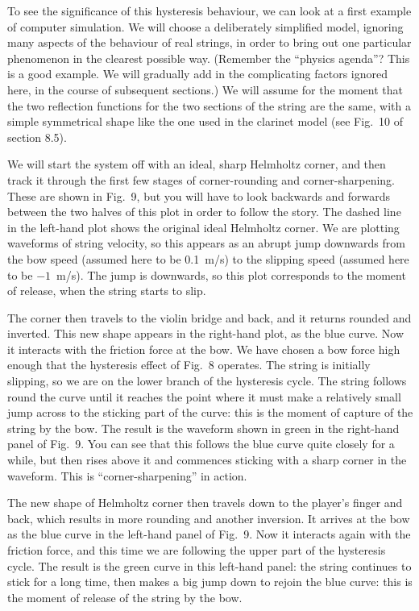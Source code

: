   To see the significance of this hysteresis behaviour, we can look at a first 
  example of computer simulation. We will choose a deliberately simplified 
  model, ignoring many aspects of the behaviour of real strings, in order to 
  bring out one particular phenomenon in the clearest possible way. (Remember 
  the “physics agenda”? This is a good example. We will gradually add in the 
  complicating factors ignored here, in the course of subsequent sections.) We 
  will assume for the moment that the two reflection functions for the two 
  sections of the string are the same, with a simple symmetrical shape like the 
  one used in the clarinet model (see Fig.\ 10 of section 8.5). 

  We will start the system off with an ideal, sharp Helmholtz corner, and then 
  track it through the first few stages of corner-rounding and 
  corner-sharpening. These are shown in Fig.\ 9, but you will have to look 
  backwards and forwards between the two halves of this plot in order to follow 
  the story. The dashed line in the left-hand plot shows the original ideal 
  Helmholtz corner. We are plotting waveforms of string velocity, so this 
  appears as an abrupt jump downwards from the bow speed (assumed here to be 
  0.1~m/s) to the slipping speed (assumed here to be $-1$~m/s). The jump is 
  downwards, so this plot corresponds to the moment of release, when the string 
  starts to slip. 

  The corner then travels to the violin bridge and back, and it returns rounded 
  and inverted. This new shape appears in the right-hand plot, as the blue 
  curve. Now it interacts with the friction force at the bow. We have chosen a 
  bow force high enough that the hysteresis effect of Fig.\ 8 operates. The 
  string is initially slipping, so we are on the lower branch of the hysteresis 
  cycle. The string follows round the curve until it reaches the point where it 
  must make a relatively small jump across to the sticking part of the curve: 
  this is the moment of capture of the string by the bow. The result is the 
  waveform shown in green in the right-hand panel of Fig.\ 9. You can see that 
  this follows the blue curve quite closely for a while, but then rises above 
  it and commences sticking with a sharp corner in the waveform. This is 
  “corner-sharpening” in action. 

  The new shape of Helmholtz corner then travels down to the player’s finger 
  and back, which results in more rounding and another inversion. It arrives at 
  the bow as the blue curve in the left-hand panel of Fig.\ 9. Now it interacts 
  again with the friction force, and this time we are following the upper part 
  of the hysteresis cycle. The result is the green curve in this left-hand 
  panel: the string continues to stick for a long time, then makes a big jump 
  down to rejoin the blue curve: this is the moment of release of the string by 
  the bow. 

